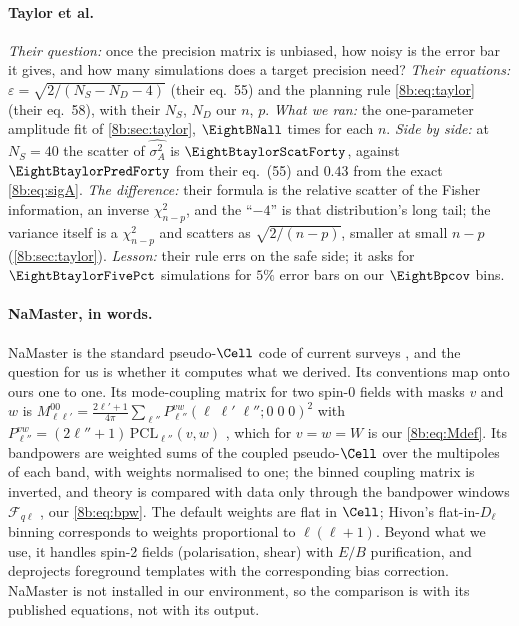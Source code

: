\paragraph{Taylor et al.}
\emph{Their question:} once the precision matrix is unbiased, how noisy is the error bar it gives, and how
many simulations does a target precision need? \emph{Their equations:} $\varepsilon=\sqrt{2/(N_S-N_D-4)}$ (their eq.~55) and
the planning rule \eqref{8b:eq:taylor} (their eq.~58), with their $N_S$, $N_D$ our $n$, $p$. \emph{What we ran:} the
one-parameter amplitude fit of \cref{8b:sec:taylor}, $\EightBNall$ times for each $n$. \emph{Side by side:} at
$N_S=40$ the scatter of $\widehat{\sigma^2_A}$ is $\EightBtaylorScatForty$, against $\EightBtaylorPredForty$ from their eq.~(55) and $0.43$ from
the exact \eqref{8b:eq:sigA}. \emph{The difference:} their formula is the relative scatter of the Fisher
information, an inverse $\chi^2_{n-p}$, and the ``$-4$'' is that distribution's long tail; the variance itself is a
$\chi^2_{n-p}$ and scatters as $\sqrt{2/(n-p)}$, smaller at small $n-p$ (\cref{8b:sec:taylor}). \emph{Lesson:} their rule
errs on the safe side; it asks for $\EightBtaylorFivePct$ simulations for $5\%$ error bars on our $\EightBpcov$ bins.

\paragraph{NaMaster, in words.}
NaMaster is the standard pseudo-$\Cell$ code of current surveys \cite{Alonso2019}, and the question for us
is whether it computes what we derived. Its conventions map onto
ours one to one. Its mode-coupling matrix for two spin-0 fields with masks $v$ and $w$ is
$M^{00}_{\ell\ell'}=\frac{2\ell'+1}{4\pi}\sum_{\ell''}P^{vw}_{\ell''}(\ell\;\ell'\;\ell'';0\;0\;0)^2$ with
$P^{vw}_{\ell''}=(2\ell''+1)\,\mathrm{PCL}_{\ell''}(v,w)$ \cite[eq.~12]{Alonso2019}, which for $v=w=W$ is our
\eqref{8b:eq:Mdef}. Its bandpowers are weighted sums of the coupled pseudo-$\Cell$ over the multipoles of
each band, with weights normalised to one; the binned coupling matrix is inverted, and theory is
compared with data only through the bandpower windows $\mathcal F_{q\ell}$ \cite[eqs~15--19]{Alonso2019}, our
\eqref{8b:eq:bpw}. The default weights are flat in $\Cell$; Hivon's flat-in-$D_\ell$ binning corresponds to
weights proportional to $\ell(\ell+1)$. Beyond what we use, it handles spin-2 fields (polarisation, shear) with
$E/B$ purification, and deprojects foreground templates with the corresponding bias correction. NaMaster
is not installed in our environment, so the comparison is with its published equations, not with its
output.

